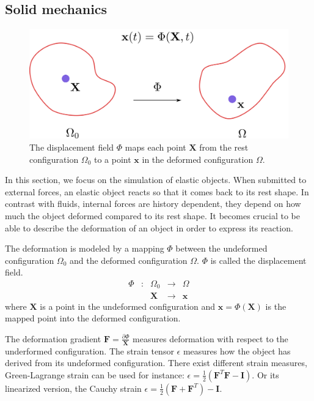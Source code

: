 \subsection{Solid mechanics}
\label{subsec:solidMechanics}

\begin{figure}[!ht]
\centering
\includegraphics[scale=0.4]{./images/continuum_mechanics/displacementField.png}
\caption[STAR mechanics: Displacement field]{\label{fig:displacementField}
 The displacement field $\Phi$ maps each point $\mathbf{X}$ from the rest configuration $\Omega_{0}$ to a point $\mathbf{x}$ in the deformed configuration $\Omega$.}
\end{figure}

In this section, we focus on the simulation of elastic objects. When submitted to external forces, an elastic object reacts so that it comes back to its rest shape. In contrast with fluids, internal forces are history dependent, they depend on how much the object deformed compared to its rest shape. It becomes crucial to be able to describe the deformation of an object in order to express its reaction. 

The deformation is modeled by a mapping $\Phi$ between the undeformed configuration $\Omega_{0}$ and the deformed configuration $\Omega$. $\Phi$ is called the displacement field.
\begin{equation}
\begin{array}{lllll}
\Phi & : & \Omega_{0} & \longrightarrow & \Omega \\
	 &  & \mathbf{X} & \longrightarrow & \mathbf{x}
\end{array}
\end{equation}
where $\mathbf{X}$ is a point in the undeformed configuration and $\mathbf{x}=\Phi(\mathbf{X})$ is the mapped point into the deformed configuration.

The deformation gradient $\displaystyle \mathbf{F} = \frac{\partial \Phi}{\mathbf{X}}$ measures deformation with respect to the underformed configuration. The strain tensor $\epsilon$ measures how the object has derived from its undeformed configuration. There exist different strain measures, Green-Lagrange strain can be used for instance: $\displaystyle \epsilon = \frac{1}{2}\left(\mathbf{F}^{T}\mathbf{F} - \mathbf{I}\right)$. Or its linearized version, the Cauchy strain $\displaystyle \epsilon = \frac{1}{2}\left( \mathbf{F} + \mathbf{F}^{T} \right)-\mathbf{I}$.

